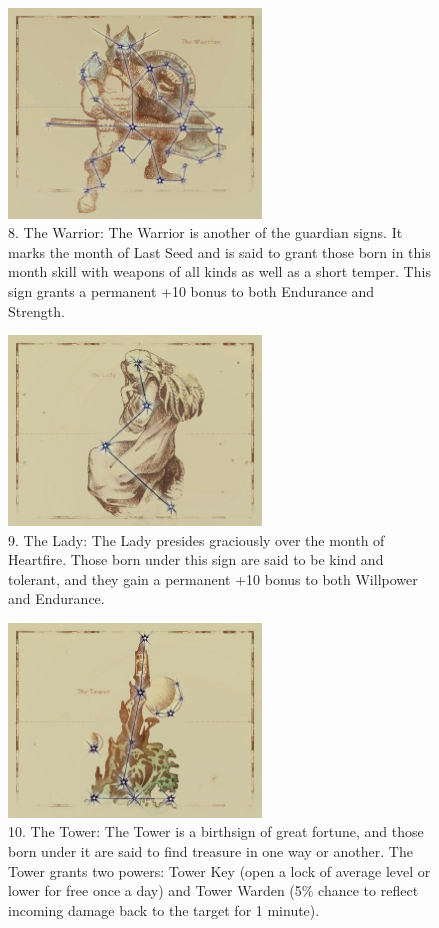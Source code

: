 \documentclass[12pt]{article}
\begin{document}
\begin{figure}[H]
\includegraphics[width=0.6\textwidth]{Warrior.png}
\centering
\caption*{8. The Warrior: The Warrior is another of the guardian signs. It marks the month of Last Seed and is said to grant those born in this month skill with weapons of all kinds as well as a short temper. This sign grants a permanent +10 bonus to both Endurance and Strength.}
\end{figure}

\begin{figure}[H]
\includegraphics[width=0.6\textwidth]{Lady.png}
\centering
\caption*{9. The Lady: The Lady presides graciously over the month of Heartfire. Those born under this sign are said to be kind and tolerant, and they gain a permanent +10 bonus to both Willpower and Endurance.}
\end{figure}

\begin{figure}[H]
\includegraphics[width=0.6\textwidth]{Tower.png}
\centering
\caption*{10. The Tower: The Tower is a birthsign of great fortune, and those born under it are said to find treasure in one way or another. The Tower grants two powers: Tower Key (open a lock of average level or lower for free once a day) and Tower Warden (5\% chance to reflect incoming damage back to the target for 1 minute).}
\end{figure}
\end{document}
